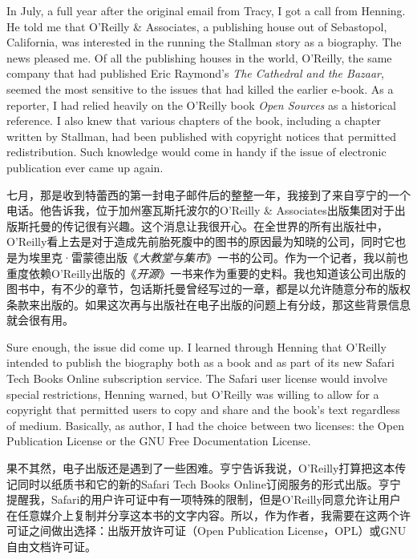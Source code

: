 \ifdefined\eng
In July, a full year after the original email from Tracy, I got a call from Henning. He told me that O'Reilly \& Associates, a publishing house out of Sebastopol, California, was interested in the running the Stallman story as a biography. %
The news pleased me. Of all the publishing houses in the world, O'Reilly, the same company that had published Eric Raymond's \textit{The Cathedral and the Bazaar}, seemed the most sensitive to the issues that had killed the earlier e-book. As a reporter, I had relied heavily on the O'Reilly book \textit{Open Sources} as a historical reference. I also knew that various chapters of the book, including a chapter written by Stallman, had been published with copyright notices that permitted redistribution. Such knowledge would come in handy if the issue of electronic publication ever came up again.
\fi

\ifdefined\chs
七月，那是收到特蕾西的第一封电子邮件后的整整一年，我接到了来自亨宁的一个电话。他告诉我，位于加州塞瓦斯托波尔的O'Reilly \& Associates出版集团对于出版斯托曼的传记很有兴趣。这个消息让我很开心。在全世界的所有出版社中，O'Reilly看上去是对于造成先前胎死腹中的图书的原因最为知晓的公司，同时它也是为埃里克·雷蒙德出版《\textit{大教堂与集市}》一书的公司。作为一个记者，我以前也重度依赖O'Reilly出版的《\textit{开源}》一书来作为重要的史料。我也知道该公司出版的图书中，有不少的章节，包话斯托曼曾经写过的一章，都是以允许随意分布的版权条款来出版的。如果这次再与出版社在电子出版的问题上有分歧，那这些背景信息就会很有用。
\fi

\ifdefined\eng
Sure enough, the issue did come up. I learned through Henning that O'Reilly intended to publish the biography both as a book and as part of its new Safari Tech Books Online subscription service. The Safari user license would involve special restrictions, Henning warned, but O'Reilly was willing to allow for a copyright that permitted users to copy and share and the book's text regardless of medium. Basically, as author, I had the choice between two licenses: the Open Publication License or the GNU Free Documentation License.
\fi

\ifdefined\chs
果不其然，电子出版还是遇到了一些困难。亨宁告诉我说，O'Reilly打算把这本传记同时以纸质书和它的新的Safari Tech Books Online订阅服务的形式出版。亨宁提醒我，Safari的用户许可证中有一项特殊的限制，但是O'Reilly同意允许让用户在任意媒介上复制并分享这本书的文字内容。所以，作为作者，我需要在这两个许可证之间做出选择：出版开放许可证（Open Publication License，OPL）或GNU自由文档许可证。
\fi

